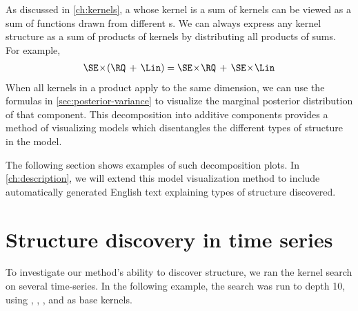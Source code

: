 As discussed in \cref{ch:kernels}, a \gp{} whose kernel is a sum of kernels can be viewed as a sum of functions drawn from different \gp{}s.
We can always express any kernel structure as a sum of products of kernels by distributing all products of sums.
For example,
%
\begin{align}
\SE \kerntimes (\RQ \kernplus \Lin) = \SE \kerntimes  \RQ \kernplus \SE \kerntimes \Lin
\end{align}
%
When all kernels in a product apply to the same dimension, we can use the formulas in \cref{sec:posterior-variance} to visualize the marginal posterior distribution of that component.
This decomposition into additive components provides a method of visualizing \gp{} models which disentangles the different types of structure in the model.

The following section shows examples of such decomposition plots.
In \cref{ch:description}, we will extend this model visualization method to include automatically generated English text explaining types of structure discovered.



\section{Structure discovery in time series}
\label{sec:time_series}

To investigate our method's ability to discover structure, we ran the kernel search on several time-series.
In the following example, the search was run to depth 10, using \kSE{}, \kRQ{}, \kLin{}, \kPer{} and \kWN{} as base kernels.

